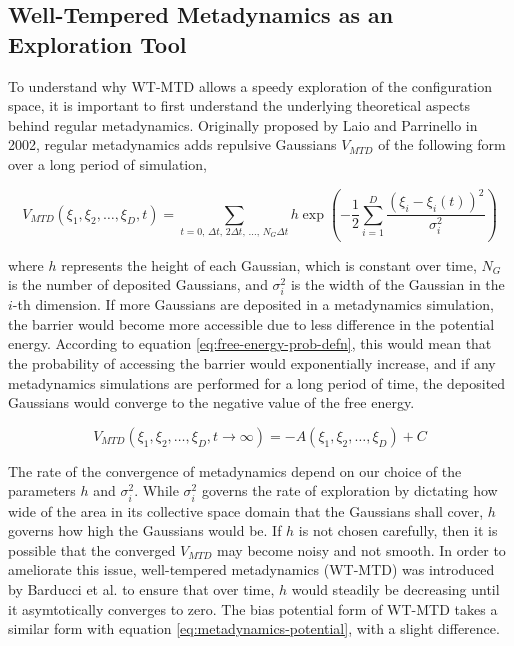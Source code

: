 \begin{spacing}{2.0}
    \subsection{Well-Tempered Metadynamics as an Exploration Tool}

    To understand why WT-MTD allows a speedy exploration of the configuration space, it is important to first understand the underlying 
    theoretical aspects behind regular metadynamics. Originally proposed by Laio and Parrinello in 2002, regular metadynamics adds repulsive
    Gaussians $V_{MTD}$ of the following form over a long period of simulation, \cite{P-PNAS-2002-v99-Laio}

    \begin{equation}
        V_{MTD}(\xi_1,\xi_2,\ldots,\xi_D,t) = \sum_{t=0,\,\Delta t,\,2\Delta t,\,\ldots,\,N_G\Delta t} 
            h\exp\left(-\frac{1}{2}\sum_{i=1}^D\frac{\left(\xi_i-\xi_i(t)\right)^2}{\sigma_i^2}\right)
        \label{eq:metadynamics-potential}
    \end{equation}

    \noindent where $h$ represents the height of each Gaussian, which is constant over time, $N_G$ is the number of deposited Gaussians,
    and $\sigma_i^2$ is the width of the Gaussian in the $i$-th dimension. If more Gaussians are deposited in a metadynamics simulation, the 
    barrier would become more accessible due to less difference in the potential energy. According to equation \ref{eq:free-energy-prob-defn}, 
    this would mean that the probability of accessing the barrier would exponentially increase, and if any metadynamics simulations are performed 
    for a long period of time, the deposited Gaussians would converge to the negative value of the free energy.

    \begin{equation}
        V_{MTD}(\xi_1,\xi_2,\ldots,\xi_D, t\to\infty) = -A(\xi_1,\xi_2,\ldots,\xi_D) + C
    \end{equation}

    The rate of the convergence of metadynamics depend on our choice of the parameters $h$ and $\sigma_i^2$. While $\sigma_i^2$ governs 
    the rate of exploration by dictating how wide of the area in its collective space domain that the Gaussians shall cover, $h$
    governs how high the Gaussians would be. If $h$ is not chosen carefully, then it is possible that the converged $V_{MTD}$ may become
    noisy and not smooth. In order to ameliorate this issue, well-tempered metadynamics (WT-MTD) was introduced by Barducci et al.
    to ensure that over time, $h$ would steadily be decreasing until it asymtotically converges to zero. The bias potential form
    of WT-MTD takes a similar form with equation \ref{eq:metadynamics-potential}, with a slight difference.


\end{spacing}

